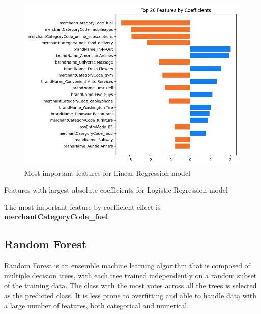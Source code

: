 \documentclass[12pt]{article}
\begin{document}
\begin{figure}[h]
    \centering
    \includegraphics[width=\textwidth]{images/lr_feature_importances.png}
    \caption{Most important features for Linear Regression model}
    \label{fig:enter-label}
\end{figure}

\begin{table}[h]
    \centering
    \resizebox{0.5\textwidth}{!}{%
     }
    \caption{Features with largest absolute coefficients for Logistic Regression model}
    \label{tab:my_label}
\end{table}

The most important feature by coefficient effect is \textbf{merchantCategoryCode\_fuel}.
\newpage
\subsection{Random Forest}
Random Forest is an ensemble machine learning algorithm that is composed of multiple decision trees, with each tree trained independently on a random subset of the training data. The class with the most votes across all the trees is selected as the predicted class. It is less prone to overfitting and able to handle data with a large number of features, both categorical and numerical.
\end{document}
